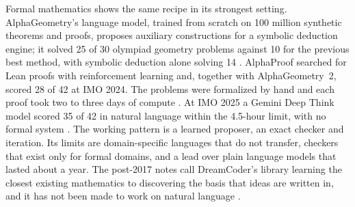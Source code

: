 Formal mathematics shows the same recipe in its strongest setting. AlphaGeometry's language model, trained from scratch on 100 million synthetic theorems and proofs, proposes auxiliary constructions for a symbolic deduction engine; it solved 25 of 30 olympiad geometry problems against 10 for the previous best method, with symbolic deduction alone solving 14 \cite{post60}. AlphaProof searched for Lean proofs with reinforcement learning and, together with AlphaGeometry~2, scored 28 of 42 at IMO 2024. The problems were formalized by hand and each proof took two to three days of compute \cite{post61}. At IMO 2025 a Gemini Deep Think model scored 35 of 42 in natural language within the 4.5-hour limit, with no formal system \cite{post62}. The working pattern is a learned proposer, an exact checker and iteration. Its limits are domain-specific languages that do not transfer, checkers that exist only for formal domains, and a lead over plain language models that lasted about a year. The post-2017 notes call DreamCoder's library learning the closest existing mathematics to discovering the basis that ideas are written in, and it has not been made to work on natural language \cite{post49}.

